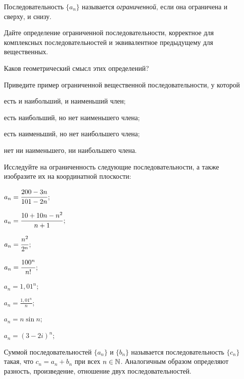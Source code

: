 \documentclass[a4paper, 12pt, num=24]{listok}
\begin{document}
\begin{definition}
    Последовательность $\{a_n\}$ называется \textit{ограниченной}, если она ограничена и сверху, и снизу.
\end{definition}
\begin{problem}
\begin{probparts}
    \item Дайте определение ограниченной последовательности, корректное для комплексных последовательностей и эквивалентное предыдущему для вещественных.
    \item Каков геометрический смысл этих определений?
\end{probparts}
\end{problem}
\begin{problem}
    Приведите пример ограниченной вещественной последовательности, у которой
    \begin{probparts}
        \item есть и наибольший, и наименьший член;
        \item есть наибольший, но нет наименьшего члена;
        \item есть наименьший, но нет наибольшего члена;
        \item нет ни наименьшего, ни наибольшего члена.
    \end{probparts}
\end{problem}
\begin{problem}[$\mathghost$]\label{exfirst}
    Исследуйте на ограниченность следующие последовательности, а также изобразите их на координатной плоскости:
    \begin{multienum}{3}
        \item $a_n = \cfrac{200 - 3n}{101 - 2n}$;
        \item $a_n = \cfrac{10 + 10n - n^2}{n + 1}$;
        \item $a_n = \cfrac{n^2}{2^n}$;
        \item $a_n = \cfrac{100^n}{n!}$;
        \item $a_n = 1,{}01^n$;
        \item $a_n = \frac{1,{}01^n}n$;
        \item $a_n = n \sin{n}$;
        \item $a_n = {(3 - 2i)}^n$;
    \end{multienum}
\end{problem}
\begin{definition}
    Суммой последовательностей $\{a_n\}$ и $\{b_n\}$ называется последовательность $\{c_n\}$ такая,
    что $c_n = a_n + b_n$ при всех $n \in \mathbb{N}$.
    Аналогичным образом определяют разность, произведение, отношение двух последовательностей.
\end{definition}
\end{document}
